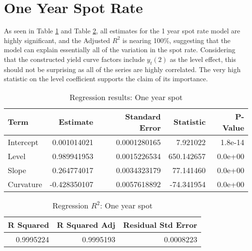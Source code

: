 \documentclass[openany]{book}
\theoremstyle{definition}
\theoremstyle{definition}
\theoremstyle{definition}
\theoremstyle{remark}
\begin{document}
\normalsize

\hypertarget{one-year-spot-rate}{%
\section{One Year Spot Rate}\label{one-year-spot-rate}}

As seen in Table \ref{tab:one-year-reg} and Table
\ref{tab:one-year-reg-r2}, all estimates for the 1 year spot rate model
are highly significant, and the Adjusted \(R^2\) is nearing 100\%,
suggesting that the model can explain essentially all of the variation
in the spot rate. Considering that the constructed yield curve factors
include \(y_t(2)\) as the level effect, this should not be surprising as
all of the series are highly correlated. The very high statistic on the
level coefficient supports the claim of its importance.

\small

\begin{table}[H]

\caption{\label{tab:one-year-reg}Regression results: One year spot}
\centering
\begin{tabular}[t]{lrrrr}
\toprule
Term & Estimate & Standard Error & Statistic & P-Value\\
\midrule
Intercept & 0.001014021 & 0.0001280165 & 7.921022 & 1.8e-14\\
Level & 0.989941953 & 0.0015226534 & 650.142657 & 0.0e+00\\
Slope & 0.264774017 & 0.0034323179 & 77.141460 & 0.0e+00\\
Curvature & -0.428350107 & 0.0057618892 & -74.341954 & 0.0e+00\\
\bottomrule
\end{tabular}
\end{table}

\normalsize

\small

\begin{table}[H]

\caption{\label{tab:one-year-reg-r2}Regression $R^2$: One year spot}
\centering
\begin{tabular}[t]{rrr}
\toprule
R Squared & R Squared Adj & Residual Std Error\\
\midrule
0.9995224 & 0.9995193 & 0.0008223\\
\bottomrule
\end{tabular}
\end{table}

\normalsize
\end{document}
